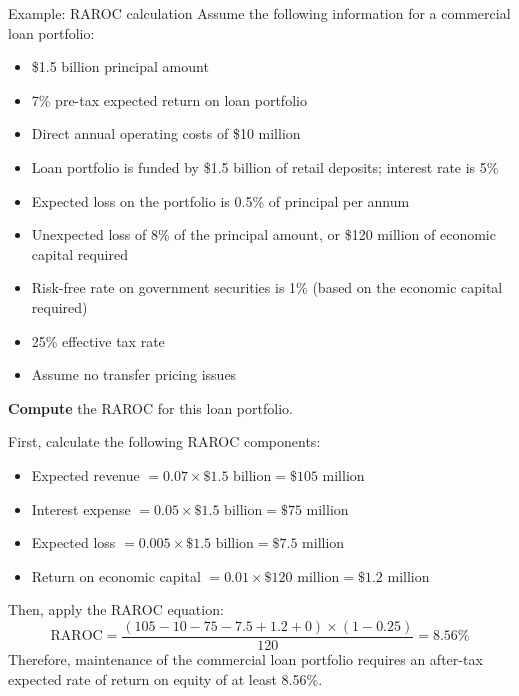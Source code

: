\begin{orexambox}{Example: RAROC calculation}
Assume the following information for a commercial loan portfolio:
\begin{itemize}
\item \$1.5 billion principal amount
\item 7\% pre-tax expected return on loan portfolio
\item Direct annual operating costs of \$10 million
\item Loan portfolio is funded by \$1.5 billion of retail deposits; interest rate
is 5\%
\item Expected loss on the portfolio is 0.5\% of principal per annum
\item Unexpected loss of 8\% of the principal amount, or \$120 million of economic
capital required
\item Risk-free rate on government securities is 1\% (based on the economic
capital required)
\item 25\% effective tax rate
\item Assume no transfer pricing issues
\end{itemize}
\textbf{Compute} the RAROC for this loan portfolio.

\vspace{7pt}
\par
\vspace{3pt}
First, calculate the following RAROC components:
\begin{itemize}
\item Expected revenue $= 0.07 \times \$1.5\text{ billion} = \$105$ million
\item Interest expense $= 0.05 \times \$1.5\text{ billion} = \$75$ million
\item Expected loss $= 0.005 \times \$1.5\text{ billion} = \$7.5$ million
\item Return on economic capital $= 0.01 \times \$120\text{ million} = \$1.2$
million
\end{itemize}
Then, apply the RAROC equation:
\[
\mathrm{RAROC}=\frac{(105-10-75-7.5+1.2+0)\times(1-0.25)}{120}=8.56\%
\]
Therefore, maintenance of the commercial loan portfolio requires an after-tax
expected rate of return on equity of at least 8.56\%.
\end{orexambox}


